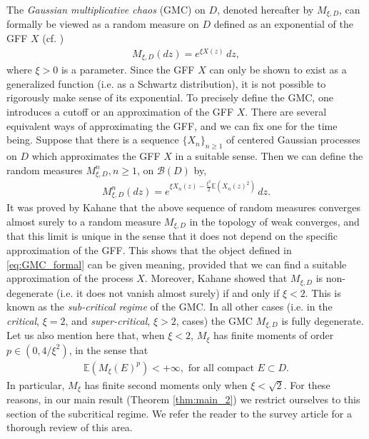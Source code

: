 \documentclass[a4paper, 11pt, reqno]{amsart}
\theoremstyle{definition} \newtheorem{defn}{Definition}[section]
\theoremstyle{remark} \newtheorem{rem}[defn]{Remark}
\theoremstyle{remark} \newtheorem*{rem*}{Remark}
\theoremstyle{plain} \newtheorem{thm}[defn]{Theorem}
\theoremstyle{plain} \newtheorem{lem}[defn]{Lemma}
\theoremstyle{plain} \newtheorem{prop}[defn]{Proposition}
\theoremstyle{plain} \newtheorem{cor}[defn]{Corollary}
\theoremstyle{remark} \newtheorem{exm}[defn]{\textbf{Example}}
\theoremstyle{remark} \newtheorem{exms}[defn]{\textbf{Examples}}
\theoremstyle{remark} \newtheorem*{bl}{}
\numberwithin{equation}{section} %
\newcommand{\mc}{\mathcal}
\newcommand{\E}{\mathbb{E}}
\begin{document}
	The \textit{Gaussian multiplicative chaos} (GMC) on $D$, denoted hereafter by $M_{\xi, D}$, can formally be viewed as a random measure on $D$ defined as an exponential of the GFF $X$ (cf. \cite{rv14})
	\begin{align}\label{eq:GMC_formal}
		M_{\xi, D} (dz) =  e^{\xi X(z)} \, dz,
	\end{align}
	where $\xi>0$ is a parameter. Since the GFF $X$ can only be shown to exist as a generalized function (i.e. as a Schwartz distribution), it is not possible to rigorously make sense of its exponential.  
    To precisely define the GMC, one introduces a cutoff or an approximation of the GFF $X$. There are several equivalent ways of approximating the GFF, and we can fix one for the time being. Suppose that there is a sequence $\{X_n\}_{n \ge 1}$ of centered Gaussian processes on $D$ which approximates the GFF $X$ in a suitable sense. Then we can define the random measures $ M^n_{\xi, D }, n \ge 1$, on $\mc{B} (D)$ by,
	\begin{align}\label{eq:GMC_approx}
		M^n_{\xi, D} (dz) =  e^{\xi X_n(z) - \frac{\xi^2}{2}\E(X_n(z)^2)} \, dz.
	\end{align} 
    It was proved by Kahane that the above sequence of random measures converges almost surely to a random measure $M_{\xi, D}$ in the topology of weak converges, and that this limit is unique in the sense that it does not depend on the specific approximation of the GFF. This shows that the object defined in \eqref{eq:GMC_formal} can be given meaning, provided that we can find a suitable approximation of the process $X$. Moreover, Kahane showed that $M_{\xi, D}$ is non-degenerate (i.e. it does not vanish almost surely) if and only if $\xi < 2$. This is known as the \textit{sub-critical regime} of the GMC. In all other cases (i.e. in the \textit{critical}, $\xi =2$, and \textit{super-critical}, $\xi >2$, cases) the GMC $M_{\xi, D}$ is fully degenerate. Let us also mention here that, when $\xi <2$, $M_{\xi}$ has finite moments of order $p \in (0, 4/\xi^2)$, in the sense that 
    \begin{align}
        \E(M_{\xi}(E)^p) < +\infty, \text{  for all compact } E \subset D.
    \end{align}
    In particular, $M_{\xi}$ has finite second moments only when $\xi < \sqrt{2}$. For these reasons, in our main result (Theorem \ref{thm:main_2}) we restrict ourselves to this section of the subcritical regime. We refer the reader to the survey article \cite{rv14} for a thorough review of this area.  
\end{document}
